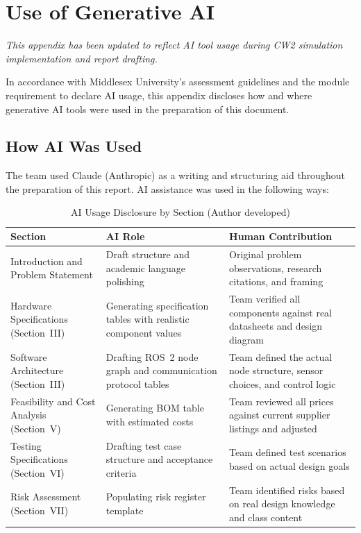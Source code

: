 \section{Use of Generative AI}
\textit{This appendix has been updated to reflect AI tool usage 
during CW2 simulation implementation and report drafting.}

In accordance with Middlesex University's assessment guidelines and the
module requirement to declare AI usage, this appendix discloses how and
where generative AI tools were used in the preparation of this document.

\subsection{How AI Was Used}

The team used Claude (Anthropic) as a writing and structuring aid
throughout the preparation of this report. AI assistance was used in the
following ways:

\begin{table}[!ht]
\caption{AI Usage Disclosure by Section (Author developed)}
\label{tab:ai}
\centering
\footnotesize
\begin{tabular}{p{1.8cm} p{2.2cm} p{2.5cm}}
\toprule
\textbf{Section} & \textbf{AI Role} & \textbf{Human Contribution} \\
\midrule
Introduction and Problem Statement & Draft structure and academic language polishing & Original problem observations, research citations, and framing \\
Hardware Specifications (Section~III) & Generating specification tables with realistic component values & Team verified all components against real datasheets and design diagram \\
Software Architecture (Section~III) & Drafting ROS~2 node graph and communication protocol tables & Team defined the actual node structure, sensor choices, and control logic \\
Feasibility and Cost Analysis (Section~V) & Generating BOM table with estimated costs & Team reviewed all prices against current supplier listings and adjusted \\
Testing Specifications (Section~VI) & Drafting test case structure and acceptance criteria & Team defined test scenarios based on actual design goals \\
Risk Assessment (Section~VII) & Populating risk register template & Team identified risks based on real design knowledge and class content \\
\bottomrule
\end{tabular}
\end{table}


